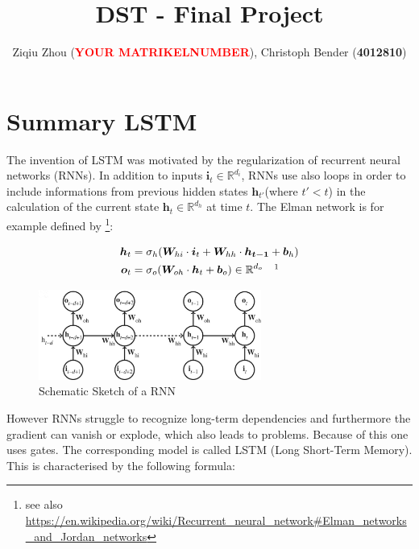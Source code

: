 \documentclass{scrarticle}
\title{DST - Final Project}
\author{Ziqiu Zhou (\textbf{\textcolor{red}{YOUR MATRIKELNUMBER}}), Christoph Bender (\textbf{4012810})}
\begin{document}
	\maketitle
	\clearpage
	\section{Summary LSTM \cite{Vlachas}}
	The invention of LSTM was motivated by the regularization of recurrent neural networks (RNNs). In addition to inputs $\bm{i}_t \in \mathbb{R}^{d_i}$, RNNs use also loops in order to include informations from previous hidden states $\bm{h}_{t'}$(where $t'<t$) in the calculation of the current state $\bm{h}_t \in \mathbb{R}^{d_h}$ at time $t$. The Elman network \cite{Elman} is for example defined by \footnote{see also \url{https://en.wikipedia.org/wiki/Recurrent_neural_network\#Elman_networks_and_Jordan_networks}}:
	\begin{figure}[h]
	\begin{minipage}[h][3cm][t]{7cm}
	\begin{align}
		\bm{h}_t&=\sigma_h(\bm{W}_{hi}\cdot\bm{i}_t+\bm{W}_{hh}\cdot\bm{h_{t-1}}+\bm{b}_h)\\
		\bm{o}_t&=\sigma_o(\bm{W}_{oh}\cdot\bm{h}_t+\bm{b}_o) \in \mathbb{R}^{d_o} \quad \footnotemark
	\end{align}
	\vfill
	\caption{Schematic Sketch of a RNN \cite{Vlachas}}
	\end{minipage}
	\begin{minipage}[h][3cm][c]{7.5cm}
		\centering
		\includegraphics[width=7.3cm]{images/RNN_Vlachas_cropped.png}
	\end{minipage}
	\end{figure}
	However RNNs struggle to recognize long-term dependencies and furthermore the gradient can vanish or explode, which also leads to problems. Because of this one uses gates. The corresponding model is called LSTM (Long Short-Term Memory). This is characterised by the following formula:
\end{document}
